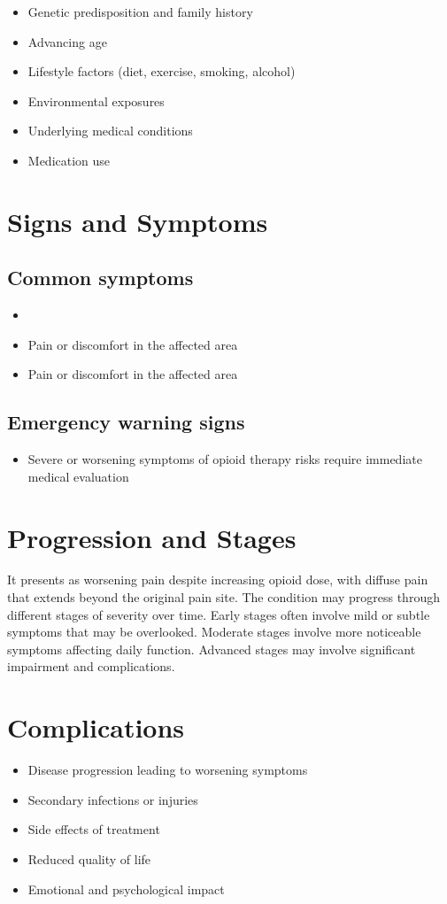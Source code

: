 \begin{itemize}[noitemsep]
  \item Genetic predisposition and family history
  \item Advancing age
  \item Lifestyle factors (diet, exercise, smoking, alcohol)
  \item Environmental exposures
  \item Underlying medical conditions
  \item Medication use
\end{itemize}
\section{Signs and Symptoms}

\subsection{Common symptoms}
\begin{itemize}[noitemsep]
  \item \item Pain or discomfort in the affected area    \item Pain or discomfort in the affected area
  \end{itemize}

\subsection{Emergency warning signs}
\begin{itemize}[noitemsep]
  \item Severe or worsening symptoms of opioid therapy risks require immediate medical evaluation
\end{itemize}
\section{Progression and Stages}
It presents as worsening pain despite increasing opioid dose, with diffuse pain that extends beyond the original pain site. The condition may progress through different stages of severity over time. Early stages often involve mild or subtle symptoms that may be overlooked. Moderate stages involve more noticeable symptoms affecting daily function. Advanced stages may involve significant impairment and complications.
\section{Complications}
\begin{itemize}[noitemsep]
  \item Disease progression leading to worsening symptoms
  \item Secondary infections or injuries
  \item Side effects of treatment
  \item Reduced quality of life
  \item Emotional and psychological impact
\end{itemize}
